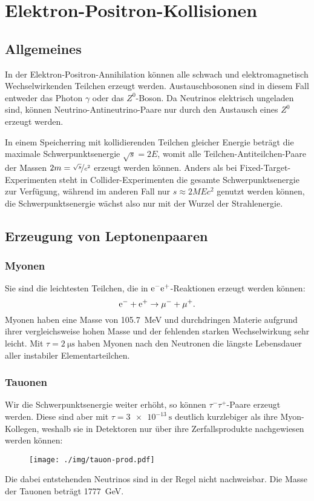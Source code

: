 \chapter{Elektron-Positron-Kollisionen}
\section{Allgemeines}
In der Elektron-Positron-Annihilation können alle schwach und elektromagnetisch Wechselwirkenden Teilchen erzeugt werden.
Austauschbosonen sind in diesem Fall entweder das Photon $\gamma$ oder das $Z^0$-Boson.
Da Neutrinos elektrisch ungeladen sind, können Neutrino-Antineutrino-Paare nur durch den Austausch eines $Z^0$ erzeugt werden.

In einem Speicherring mit kollidierenden Teilchen gleicher Energie beträgt die maximale Schwerpunktsenergie $\sqrt{s}=2E$, womit alle Teilchen-Antiteilchen-Paare der Massen $2m = \nicefrac{\sqrt{s}}{c^2}$ erzeugt werden können.
Anders als bei Fixed-Target-Experimenten steht in Collider-Experimenten die gesamte Schwerpunktsenergie zur Verfügung, während im anderen Fall nur $s\approx 2MEc^2$ genutzt werden können, die Schwerpunktsenergie wächst also nur mit der Wurzel der Strahlenergie.

\section{Erzeugung von Leptonenpaaren}
\subsection{Myonen}
Sie sind die leichtesten Teilchen, die in $\text{e}^-\text{e}^+$-Reaktionen erzeugt werden können:
\begin{equation*}
	\text{e}^- + \text{e}^+ \rightarrow \mu^- + \mu^+.
\end{equation*}
Myonen haben eine Masse von \SI{105.7}{\MeV} und durchdringen Materie aufgrund ihrer vergleichsweise hohen Masse und der fehlenden starken Wechselwirkung sehr leicht.
Mit $\tau=\SI{2}{\micro\second}$ haben Myonen nach den Neutronen die längste Lebensdauer aller instabiler Elementarteilchen.

\subsection{Tauonen}
Wir die Schwerpunktsenergie weiter erhöht, so können $\tau^-\tau^+$-Paare erzeugt werden.
Diese sind aber mit $\tau=\SI{3e-13}{\second}$ deutlich kurzlebiger als ihre Myon-Kollegen, weshalb sie in Detektoren nur über ihre Zerfallsprodukte nachgewiesen werden können:
\begin{figure}[h!]
	\centering
	\texttt{[image: ./img/tauon-prod.pdf]}
\end{figure}
Die dabei entstehenden Neutrinos sind in der Regel nicht nachweisbar.
Die Masse der Tauonen beträgt \SI{1777}{\GeV}.


